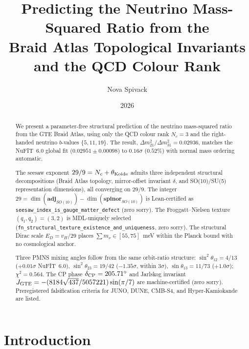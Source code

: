 \documentclass[12pt,a4paper]{article}
\title{Predicting the Neutrino Mass-Squared Ratio from the\\
Braid Atlas Topological Invariants and the QCD Colour Rank}
\author{Nova Spivack}
\date{2026}
\theoremstyle{definition}
\theoremstyle{remark}
\begin{document}
\maketitle
\NovaZenodoAfterTitle

\begin{abstract}
We present a parameter-free structural prediction of the neutrino mass-squared ratio
from the GTE Braid Atlas, using only the QCD colour rank $N_c = 3$ and the
right-handed neutrino $b$-values $\{5, 11, 19\}$.
The result, $\Delta m^2_{21}/\Delta m^2_{31} = 0.02936$, matches the NuFIT~6.0
global fit ($0.02951 \pm 0.00098$) to $0.16\sigma$ ($0.52\%$) with normal mass
ordering automatic.

The seesaw exponent $29/9 = N_c + \theta_{\rm Koide}$ admits three independent
structural decompositions (Braid Atlas topology, mirror-offset invariant $\delta$,
and SO(10)/SU(5) representation dimensions), all converging on $29/9$.
The integer $29 = \dim(\mathbf{adj}_{SO(10)}) - \dim(\mathbf{spinor}_{SO(10)})$
is Lean-certified as \texttt{seesaw\_index\_is\_gauge\_matter\_defect} (zero sorry).
The Froggatt--Nielsen texture $(q_1,q_2)=(3,2)$ is MDL-uniquely selected
(\texttt{fn\_structural\_texture\_existence\_and\_uniqueness}, zero sorry).
The structural Dirac scale $E_D = v_H/29$ places $\sum m_\nu \in [55,75]$~meV
within the Planck bound with no cosmological anchor.

Three PMNS mixing angles follow from the same orbit-ratio structure:
$\sin^2\theta_{12} = 4/13$ ($+0.01\sigma$ NuFIT~6.0),
$\sin^2\theta_{23} = 19/42$ ($-1.35\sigma$, within $3\sigma$),
$\sin\theta_{13} = 11/73$ ($+1.0\sigma$); $\chi^2 = 0.564$.
The CP phase $\delta_{\rm CP} = 205.71^\circ$ and Jarlskog invariant
$J_{\rm GTE} = -(8184\sqrt{437}/5057221)\sin(\pi/7)$ are machine-certified
(zero sorry). Preregistered falsification criteria for JUNO, DUNE, CMB-S4,
and Hyper-Kamiokande are listed.
\end{abstract}

\tableofcontents
\newpage

\section{Introduction}
\label{sec:intro}
\end{document}
